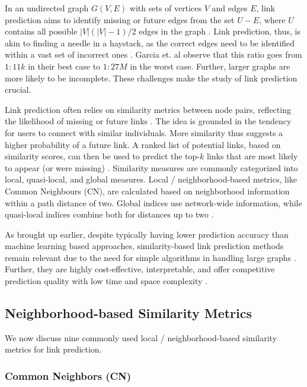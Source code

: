 In an undirected graph $G(V, E)$ with sets of vertices $V$ and edges $E$, link prediction aims to identify missing or future edges from the set $U - E$, where $U$ contains all possible $|V|(|V|-1)/2$ edges in the graph \cite{zhou2021progresses}. Link prediction, thus, is akin to finding a needle in a haystack, as the correct edges need to be identified within a vast set of incorrect ones \cite{garcia2014link, wang2014link}. Garcia et. al \cite{garcia2014link} observe that this ratio goes from $1:11k$ in their best case to $1:27M$ in the worst case. Further, larger graphs are more likely to be incomplete. These challenges make the study of link prediction crucial.

Link prediction often relies on similarity metrics between node pairs, reflecting the likelihood of missing or future links \cite{wang2014link, arrar2023comprehensive}. The idea is grounded in the tendency for users to connect with similar individuals. More similarity thus suggests a higher probability of a future link. A ranked list of potential links, based on similarity scores, can then be used to predict the top-$k$ links that are most likely to appear (or were missing) \cite{wang2014link}. Similarity measures are commonly categorized into local, quasi-local, and global measures. Local / neighborhood-based metrics, like Common Neighbours (CN), are calculated based on neighborhood information within a path distance of two. Global indices use network-wide information, while quasi-local indices combine both for distances up to two \cite{arrar2023comprehensive}.

As brought up earlier, despite typically having lower prediction accuracy than machine learning based approaches, similarity-based link prediction methods remain relevant due to the need for simple algorithms in handling large graphs \cite{garcia2014link}. Further, they are highly cost-effective, interpretable, and offer competitive prediction quality with low time and space complexity \cite{zhou2021progresses, barbieri2014follow}.




\subsection{Neighborhood-based Similarity Metrics}
\label{sec:metrics}

We now discuss nine commonly used local / neighborhood-based similarity metrics for link prediction.


\subsubsection{Common Neighbors (CN)}

